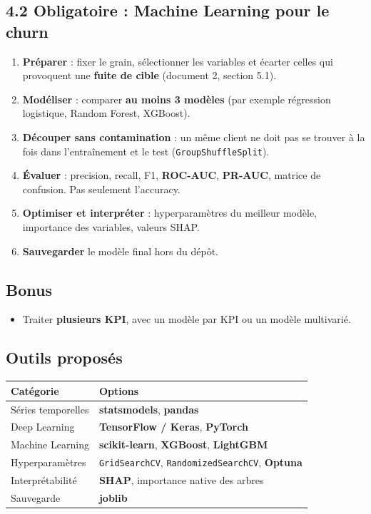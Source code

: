 \documentclass[11pt,a4paper]{article}
\providecommand{\tightlist}{\setlength{\itemsep}{0pt}\setlength{\parskip}{0pt}}
\begin{document}
\subsection{4.2 Obligatoire : Machine Learning pour le
churn}\label{obligatoire-machine-learning-pour-le-churn}

\begin{enumerate}
\def\labelenumi{\arabic{enumi}.}
\tightlist
\item
  \textbf{Préparer} : fixer le grain, sélectionner les variables et
  écarter celles qui provoquent une \textbf{fuite de cible} (document 2,
  section 5.1).
\item
  \textbf{Modéliser} : comparer \textbf{au moins 3 modèles} (par exemple
  régression logistique, Random Forest, XGBoost).
\item
  \textbf{Découper sans contamination} : un même client ne doit pas se
  trouver à la fois dans l'entraînement et le test
  (\texttt{GroupShuffleSplit}).
\item
  \textbf{Évaluer} : precision, recall, F1, \textbf{ROC-AUC},
  \textbf{PR-AUC}, matrice de confusion. Pas seulement l'accuracy.
\item
  \textbf{Optimiser et interpréter} : hyperparamètres du meilleur
  modèle, importance des variables, valeurs SHAP.
\item
  \textbf{Sauvegarder} le modèle final hors du dépôt.
\end{enumerate}

\subsection{Bonus}\label{bonus-3}

\begin{itemize}
\tightlist
\item
  Traiter \textbf{plusieurs KPI}, avec un modèle par KPI ou un modèle
  multivarié.
\end{itemize}

\subsection{Outils proposés}\label{outils-proposuxe9s-3}

{\def\LTcaptype{none} %
\begin{longtable}[]{@{}ll@{}}
\toprule\noalign{}
Catégorie & Options \\
\midrule\noalign{}
\endhead
\bottomrule\noalign{}
\endlastfoot
Séries temporelles & \textbf{statsmodels}, \textbf{pandas} \\
Deep Learning & \textbf{TensorFlow / Keras}, \textbf{PyTorch} \\
Machine Learning & \textbf{scikit-learn}, \textbf{XGBoost},
\textbf{LightGBM} \\
Hyperparamètres & \texttt{GridSearchCV}, \texttt{RandomizedSearchCV},
\textbf{Optuna} \\
Interprétabilité & \textbf{SHAP}, importance native des arbres \\
Sauvegarde & \textbf{joblib} \\
\end{longtable}
}
\end{document}
